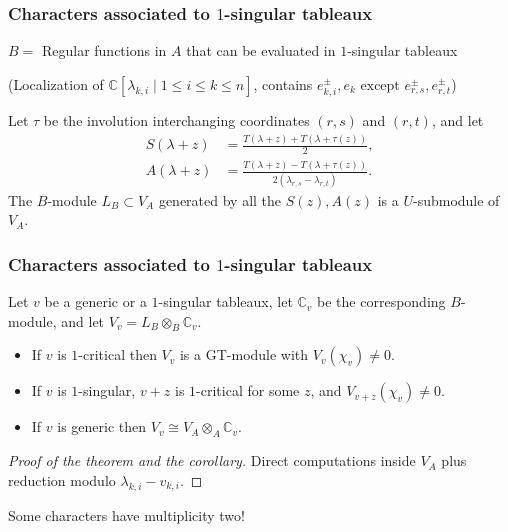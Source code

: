\documentclass[smaller,usepdftitle=false]{beamer}
\newcommand\CC{\mathbb C}
\newcommand\ot{\otimes}
\begin{document}
\begin{frame}
\frametitle{Characters associated to $1$-singular tableaux}
$B =$ Regular functions in $A$ that can be evaluated in $1$-singular 
tableaux 

(Localization of $\CC[\lambda_{k,i} \mid 1 \leq i \leq k \leq n]$, 
contains $e^\pm_{k,i}, e_k \mbox{ except } e^\pm_{r,s}, 
	e^{\pm}_{r,t}$) 
\pause
\begin{Theorem}[Z, '17]
Let $\tau$ be the involution interchanging coordinates $(r,s)$ and $(r,t)$, 
and let 
\begin{align*}
S(\lambda + z)
	&= \frac{T(\lambda + z) + T(\lambda + \tau(z))}{2},\\
A(\lambda + z)
	&= \frac{T(\lambda + z) - T(\lambda + \tau(z))}
	{2(\lambda_{r,s} - \lambda_{r,t})}.
\end{align*}
The $B$-module $L_B \subset V_A$ generated by all the $S(z), A(z)$ is a 
$U$-submodule of $V_A$. 
\end{Theorem}
\end{frame}

\begin{frame}
\frametitle{Characters associated to $1$-singular tableaux}
\begin{Corollary}
Let $v$ be a generic or a $1$-singular tableaux, let $\CC_v$ be the 
corresponding $B$-module, and let $V_v = L_B \ot_B \CC_v$.
\begin{itemize}
\item If $v$ is $1$-critical then $V_v$ is a GT-module with 
$V_v(\chi_v) \neq 0$. 
 
\item If $v$ is $1$-singular, $v+z$ is $1$-critical for some $z$, and 
$V_{v+z}(\chi_v) \neq 0$.

\item If $v$ is generic then $V_v \cong V_A \ot_A \CC_v$.
\end{itemize}
\end{Corollary}

\begin{proof}[Proof of the theorem and the corollary]
Direct computations inside $V_A$ plus reduction modulo $\lambda_{k,i} - 
v_{k,i}$.
\end{proof}

Some characters have multiplicity two!

\end{frame}
\end{document}
